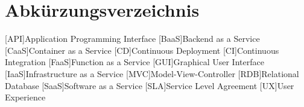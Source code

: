 \clearpage
\chapter*{Abkürzungsverzeichnis}	

\begin{acronym}[XXXXXXX]
	[API]{Application Programming Interface}
	[BaaS]{Backend as a Service}
	[CaaS]{Container as a Service}
	[CD]{Continuous Deployment}
	[CI]{Continuous Integration}
	[FaaS]{Function as a Service}
	[GUI]{Graphical User Interface}
	[IaaS]{Infrastructure as a Service}
	[MVC]{Model-View-Controller}
	[RDB]{Relational Database}
	[SaaS]{Software as a Service}
	[SLA]{Service Level Agreement}
	[UX]{User Experience}
\end{acronym}